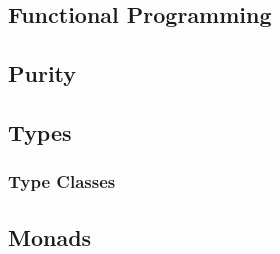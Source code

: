 \documentclass[thesis.tex]{subfiles}
\begin{document}
\subsection{Functional Programming}

\subsection{Purity}

\subsection{Types}

\subsubsection{Type Classes}

\subsection{Monads}
\end{document}
